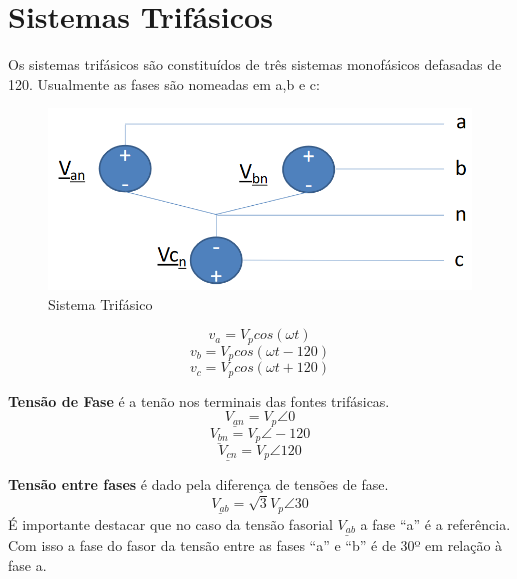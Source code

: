 \documentclass[a4paper, 12pt]{article}
\begin{document}
\section{Sistemas Trifásicos}
	Os sistemas trifásicos são constituídos de três sistemas monofásicos defasadas de 120. Usualmente as fases são nomeadas em a,b e c:
	\begin{figure}[h]
		\centering
		\includegraphics[scale=0.5]{a2.png}
		\caption{Sistema Trifásico}
	\end{figure}

	\begin{equation}
		v_a = V_p cos(\omega t) 
	\end{equation}
	\begin{equation}
		v_b = V_p cos(\omega t - 120)
	\end{equation}
	\begin{equation}
		v_c = V_p cos(\omega t + 120)
	\end{equation}

	\textbf{Tensão de Fase} é a tenão nos terminais das fontes trifásicas.
	\begin{equation}
		\underline{V_{an}} = V_p \angle 0
	\end{equation}
	\begin{equation}
		\underline{V_{bn}} = V_p \angle -120
	\end{equation}
	\begin{equation}
		\underline{V_{cn}} = V_p \angle 120
	\end{equation}

	\textbf{Tensão entre fases} é dado pela diferença de tensões de fase.
	\begin{equation}
		\underline{V_{ab}} = \sqrt{3}V_p \angle 30
	\end{equation}
	É importante destacar que no caso da tensão fasorial $\underline{V_{ab}}$ a
fase “a” é a referência. Com isso a fase do fasor da tensão entre as fases “a” e “b” é de 30º em relação à fase a.	
	
\end{document}

